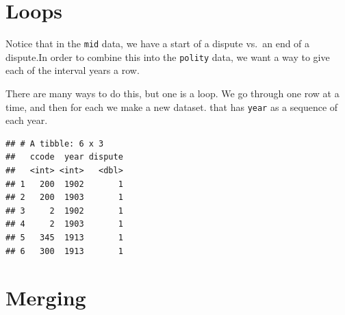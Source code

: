 \documentclass[]{book}
\newenvironment{Shaded}{\begin{snugshade}}{\end{snugshade}}
\newcommand{\CommentTok}[1]{\textcolor[rgb]{0.56,0.35,0.01}{\textit{#1}}}
\newcommand{\ControlFlowTok}[1]{\textcolor[rgb]{0.13,0.29,0.53}{\textbf{#1}}}
\newcommand{\DataTypeTok}[1]{\textcolor[rgb]{0.13,0.29,0.53}{#1}}
\newcommand{\DecValTok}[1]{\textcolor[rgb]{0.00,0.00,0.81}{#1}}
\newcommand{\KeywordTok}[1]{\textcolor[rgb]{0.13,0.29,0.53}{\textbf{#1}}}
\newcommand{\NormalTok}[1]{#1}
\newcommand{\OperatorTok}[1]{\textcolor[rgb]{0.81,0.36,0.00}{\textbf{#1}}}
\newcommand{\StringTok}[1]{\textcolor[rgb]{0.31,0.60,0.02}{#1}}
\theoremstyle{definition}
\theoremstyle{definition}
\theoremstyle{definition}
\theoremstyle{remark}
\begin{document}
\begin{Shaded}
\begin{Highlighting}[]
\begin{Shaded}
\begin{Highlighting}[]
\begin{Shaded}
\begin{Highlighting}[]
\hypertarget{loops}{%
\section{Loops}\label{loops}}

Notice that in the \texttt{mid} data, we have a start of a dispute vs.~an end of a dispute.In order to combine this into the \texttt{polity} data, we want a way to give each of the interval years a row.

There are many ways to do this, but one is a loop. We go through one row at a time, and then for each we make a new dataset. that has \texttt{year} as a sequence of each year.

\begin{Shaded}
\end{Shaded}

\begin{verbatim}
## # A tibble: 6 x 3
##   ccode  year dispute
##   <int> <int>   <dbl>
## 1   200  1902       1
## 2   200  1903       1
## 3     2  1902       1
## 4     2  1903       1
## 5   345  1913       1
## 6   300  1913       1
\end{verbatim}

\hypertarget{merging}{%
\section{Merging}\label{merging}}


\end{Highlighting}
\end{Shaded}
\end{Highlighting}
\end{Shaded}
\end{Highlighting}
\end{Shaded}
\end{document}
